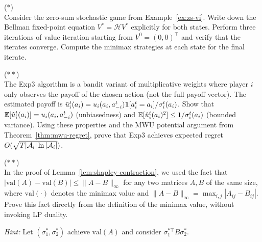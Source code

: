 \documentclass[11pt,a4paper]{article}
\begin{document}
\begin{exercise}
  \textnormal{(\(*\))} \\
  Consider the zero-sum stochastic game from
  Example~\ref{ex:zs-vi}.  Write down the Bellman fixed-point
  equation $V^* = \mathcal{H}V^*$ explicitly for both states.
  Perform three iterations of value iteration starting from
  $V^0 = (0, 0)^\top$ and verify that the iterates converge.
  Compute the minimax strategies at each state for the final
  iterate.
\end{exercise}

\begin{exercise}
  \textnormal{(\(**\))} \\
  The Exp3 algorithm is a bandit variant of multiplicative weights
  where player $i$ only observes the payoff of the chosen action
  (not the full payoff vector).  The estimated payoff is
  $\hat{u}_i^t(a_i) = u_i(a_i, a_{-i}^t) \mathbf{1}[a_i^t = a_i]
  / \sigma_i^t(a_i)$.  Show that $\mathbb{E}[\hat{u}_i^t(a_i)] =
  u_i(a_i, a_{-i}^t)$ (unbiasedness) and
  $\mathbb{E}[\hat{u}_i^t(a_i)^2] \leq 1/\sigma_i^t(a_i)$ (bounded
  variance).  Using these properties and the MWU potential argument
  from Theorem~\ref{thm:mwu-regret}, prove that Exp3 achieves
  expected regret $O(\sqrt{T |\mathcal{A}_i| \ln |\mathcal{A}_i|})$.
\end{exercise}

\begin{exercise}
  \textnormal{(\(**\))} \\
  In the proof of Lemma~\ref{lem:shapley-contraction}, we used the
  fact that
  $|\text{val}(A) - \text{val}(B)| \leq \|A - B\|_\infty$ for any
  two matrices $A, B$ of the same size, where $\text{val}(\cdot)$
  denotes the minimax value and $\|A - B\|_\infty = \max_{i,j}
  |A_{ij} - B_{ij}|$.  Prove this fact directly from the definition
  of the minimax value, without invoking LP duality.

  \textit{Hint:} Let $(\sigma_1^*, \sigma_2^*)$ achieve
  $\text{val}(A)$ and consider
  $\sigma_1^{*\top} B \sigma_2^*$.
\end{exercise}
\end{document}
